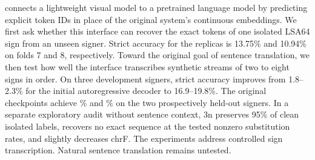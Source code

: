 \system{} connects a lightweight visual model to a pretrained language model
by predicting explicit \Gemma{} token IDs in place of the original system's
continuous embeddings.  We first ask whether this interface can recover the
exact tokens of one isolated LSA64 sign from an unseen signer.  Strict accuracy
for the replicas is 13.75\% and 10.94\% on folds 7 and 8, respectively.  Toward
the original goal of sentence translation, we then test how well the interface
transcribes synthetic streams of two to eight signs in order.  On three
development signers, strict accuracy improves from 1.8--2.3\% for the initial
autoregressive decoder to 16.9--19.8\%.  The original checkpoints achieve
\FoldSevenExact\% and \FoldEightExact\% on the two prospectively held-out
signers.  In a separate exploratory audit without sentence context, \Gemma{} 3n
preserves 95\% of clean isolated labels, recovers no exact sequence at the
tested nonzero substitution rates, and slightly decreases chrF.  The experiments
address controlled sign transcription. Natural sentence translation remains
untested.
